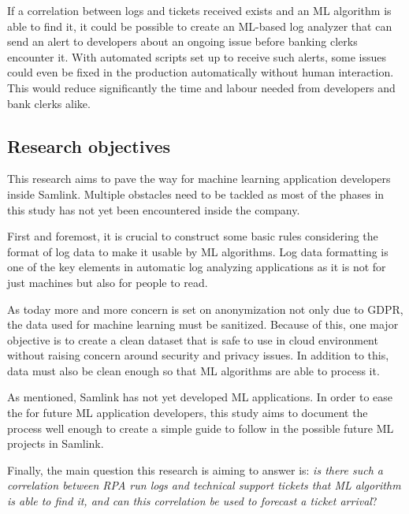 If a correlation between logs and tickets received exists
and an ML algorithm is able to find it,
it could be possible to create an ML-based log analyzer
that can send an alert to developers
about an ongoing issue before banking clerks encounter it.
With automated scripts set up to receive such alerts,
some issues could even be fixed in the production
automatically without human interaction.
This would reduce significantly the time and labour needed
from developers and bank clerks alike. %



\subsection{Research objectives}\label{subsec:intro-research-objectives}
This research aims to
pave the way for machine learning application developers
inside Samlink.
Multiple obstacles need to be tackled
as most of the phases in this study
has not yet been encountered inside the company.

First and foremost,
it is crucial to construct some basic rules
considering the format of log data
to make it usable by ML algorithms.
Log data formatting
is one of the key elements in automatic log analyzing applications
as it is not for just machines
but also for people to read.

As today more and more concern is set on anonymization
not only due to GDPR,
the data used for machine learning must be sanitized.
Because of this,
one major objective is to create a clean dataset
that is safe to use in cloud environment
without raising concern around security and privacy issues.
In addition to this,
data must also be clean enough
so that ML algorithms
are able to process it.

As mentioned,
Samlink has not yet developed ML applications.
In order to ease the %
for future ML application developers,
this study aims to document the process %
well enough to create a simple guide to follow
in the possible future ML projects in Samlink.

Finally,
the main question this research is aiming to answer is:
\textit{is there such a correlation between RPA run logs and technical support tickets
that ML algorithm is able to find it,
and can this correlation be used to forecast a ticket arrival}?


